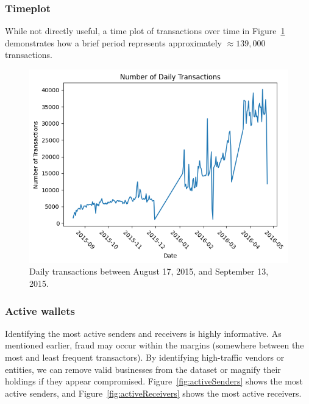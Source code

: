 \documentclass[sigconf]{acmart}
\begin{document}
\subsubsection{Timeplot}
While not directly useful, a time plot of transactions over time in Figure~\ref{fig:timePlot} demonstrates how a brief period represents approximately \( \approx 139,000 \) transactions.

\begin{figure}[H]
    \centering
    \includegraphics[width=0.8\linewidth]{M6-transactions-timeplot.png}
    \caption{Daily transactions between August 17, 2015, and September 13, 2015.}
    \label{fig:timePlot}
\end{figure}

\subsubsection{Active wallets}
Identifying the most active senders and receivers is highly informative. As mentioned earlier, fraud may occur within the margins (somewhere between the most and least frequent transactors). By identifying high-traffic vendors or entities, we can remove valid businesses from the dataset or magnify their holdings if they appear compromised. Figure~\ref{fig:activeSenders} shows the most active senders, and Figure~\ref{fig:activeReceivers} shows the most active receivers.
\end{document}
